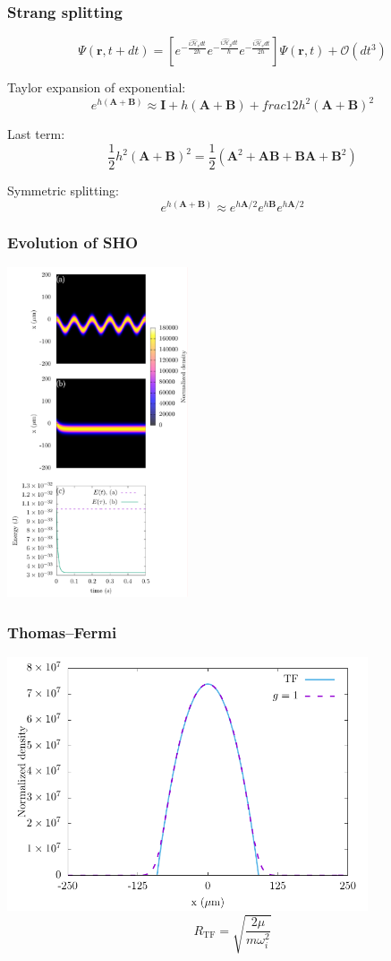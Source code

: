 \documentclass{beamer}
\begin{document}
\begin{frame}
\frametitle{Strang splitting}

$$
\Psi(\mathbf{r},t+dt) = \left[e^{-\frac{i\mathcal{\hat{H}}_vdt}{2\hbar}}e^{-\frac{i\mathcal{\hat{H}}_pdt}{\hbar}}e^{-\frac{i\mathcal{\hat{H}}_vdt}{2\hbar}} \right]\Psi(\mathbf{r},t) + \mathcal{O}(dt^3)
$$

Taylor expansion of exponential:
$$
e^{h(\mathbf{A}+\mathbf{B})} \approx \mathbf{I} + h(\mathbf{A} + \mathbf{B}) + frac{1}{2}h^2(\mathbf{A} + \mathbf{B})^2
$$

Last term:
$$
\frac{1}{2}h^2(\mathbf{A} + \mathbf{B})^2 = \frac{1}{2}\left( \mathbf{A}^2 + \mathbf{AB} + \mathbf{BA} + \mathbf{B}^2\right)
$$

Symmetric splitting:
$$
e^{h(\mathbf{A}+\mathbf{B})} \approx e^{h\mathbf{A}/2}e^{h\mathbf{B}}e^{h\mathbf{A}/2}
$$

\end{frame}

\begin{frame}
\frametitle{Evolution of SHO}

\center \includegraphics[width=0.4\textwidth]{../data/splitop/SHO/SHO_gimp.pdf}
\end{frame}

\begin{frame}
\frametitle{Thomas--Fermi}

\center \includegraphics[width = 0.8\textwidth]{../data/qs/SHO/SHO.pdf}
$$
R_\text{TF} = \sqrt{\frac{2\mu}{m\omega_i^2}}
$$
\end{frame}
\end{document}
